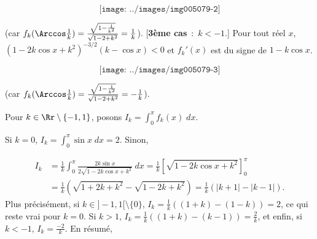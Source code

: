 {\begin{enumerate}
{\begin{itemize}
$$\texttt{[image: ../images/img005079-2]}$$

(car $f_k(\Arccos\frac{1}{k})=\frac{\sqrt{1-\frac{1}{k^2}}}{\sqrt{1-2+k^2}}=\frac{1}{k}$).
[\textbf{3ème cas}~:~$k<-1$.] Pour tout réel $x$, $(1-2k\cos x+k^2)^{-3/2}(k-\cos x)<0$ et $f_k'(x)$ est du signe de
$1-k\cos x$.

$$\texttt{[image: ../images/img005079-3]}$$



(car $f_k(\Arccos\frac{1}{k})=\frac{\sqrt{1-\frac{1}{k^2}}}{\sqrt{1-2+k^2}}=-\frac{1}{k}$).

\end{itemize}
Pour $k\in\Rr\setminus\{-1,1\}$, posons $I_k=\int_{0}^{\pi}f_k(x)\;dx$.

Si $k=0$, $I_k=\int_{0}^{\pi}\sin x\;dx=2$. Sinon,

\begin{align*}
I_k&=\frac{1}{k}\int_{0}^{\pi}\frac{2k\sin x}{2\sqrt{1-2k\cos x+k^2}}\;dx=\frac{1}{k}
\left[\sqrt{1-2k\cos x+k^2}\right]_0^\pi\\
 &=\frac{1}{k}(\sqrt{1+2k+k^2}-\sqrt{1-2k+k^2})=\frac{1}{k}(|k+1|-|k-1|).
\end{align*}
Plus précisément, si $k\in]-1,1[\setminus\{0\}$, $I_k=\frac{1}{k}((1+k)-(1-k))=2$, ce qui reste vrai pour $k=0$. Si
$k>1$, $I_k=\frac{1}{k}((1+k)-(k-1))=\frac{2}{k}$, et enfin, si $k<-1$, $I_k=\frac{-2}{k}$. En résumé,

\begin{center}
\shadowbox{
$\mbox{Si}\;k\in]-1,1[,\;I_k=2\;\mbox{et si}\;k\in]-\infty,-1[\cup]1,+\infty[,\;I_k=\frac{2}{|k|}.$
}
\end{center}
}
\end{enumerate}
}
